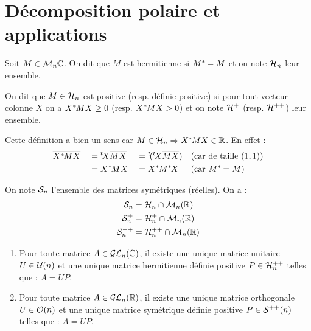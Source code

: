 
\section{Décomposition polaire et applications}
\vspace{0.5em}

\begin{defi}

Soit $M\in \M_n{\C}$. On dit que $M$ est hermitienne si $M\*=M$ et on note
$\H_n$ leur ensemble.

On dit que $M\in\H_n$ est positive (resp. définie positive) si pour tout
vecteur colonne $X$ on a $X\*MX \geq 0$ (resp. $X\*MX > 0$) et on note $\Hp$
(resp. $\Hpp$) leur ensemble.
\end{defi}

\begin{example}[Remarque]
 Cette définition a bien un sens car $M\in\H_n \Rightarrow X\*MX \in \R$.
En effet :
\begin{align*}
 & \overline{X\*MX} & &= \t X\overline{M}\overline{X} & & =
\t (\t X\overline{M}\overline{X}) & & \text{(car de taille }(1,1) \text{)} \\
 &                & & = X\*MX & & =X\*M\*X & & \text{(car } M\* = M \text{)}\\
\end{align*}
\end{example}

\begin{defi}
 
On note $\S_n$ l'ensemble des matrices symétriques (réelles). On a :
\begin{align*}
\S_n &= \H_n \cap \M_n(\R) \\
\Sp_n &= \Hp_n \cap \M_n(\R) \\
\Spp_n &= \Hpp_n \cap \M_n(\R) 
\end{align*}
\end{defi}

\begin{theo}
\label{theo_decomposition_polaire_1}
\begin{enumerate}
 \item Pour toute matrice $A\in \GL_n(\C)$, il existe une unique matrice
unitaire $U\in\U(n)$ et une unique matrice hermitienne définie positive
$P\in\Hpp_n$ telles que : $A = UP$.
 \item Pour toute matrice $A\in\GL_n(\R)$, il existe une unique matrice
orthogonale $U\in\O(n)$ et une unique matrice symétrique définie positive
$P\in\Spp(n)$ telles que : $A=UP$.
\end{enumerate}
\end{theo}

